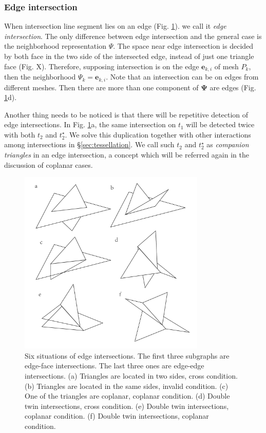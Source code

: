 \documentclass[10pt,journal,compsoc]{IEEEtran}
\begin{document}
\subsubsection{Edge intersection}





When intersection line segment lies on an edge (Fig. \ref{fig:twin}). we call it \emph{edge intersection}. The only difference between edge intersection and the general case is the neighborhood representation $\Psi$. The space near edge intersection is decided by both face in the two side of the intersected edge, instead of just one triangle face (Fig. X). Therefore, supposing intersection is on the edge $\bm{e}_{k, i}$ of mesh $P_k$, then the neighborhood $\Psi_k = \bm{e}_{k, i}$. Note that an intersection can be on edges from different meshes. Then there are more than one component of $\bm{\Psi}$ are edges (Fig. \ref{fig:twin}d).

Another thing needs to be noticed is that there will be repetitive detection of edge intersections. In Fig. \ref{fig:twin}a, the same intersection on $t_1$ will be detected twice with both $t_2$ and $t_2^{\star}$. We solve this duplication together with other interactions among intersections in \S\ref{sec:tessellation}. We call such $t_2$ and $t_2^{\star}$ as \emph{companion triangles} in an edge intersection, a concept which will be referred again in the discussion of coplanar cases.

\begin{figure}[t]
\centering
\includegraphics[width=3.5in]{twin}
\caption{Six situations of edge intersections. The first three subgraphs are edge-face intersections. The last three ones are edge-edge intersections. (a) Triangles are located in two sides, cross condition. (b) Triangles are located in the same sides, invalid condition. (c) One of the triangles are coplanar, coplanar condition. (d) Double twin intersections, cross condition. (e) Double twin intersections, coplanar condition. (f) Double twin intersections, coplanar condition.}
\label{fig:twin}
\end{figure}
\end{document}
